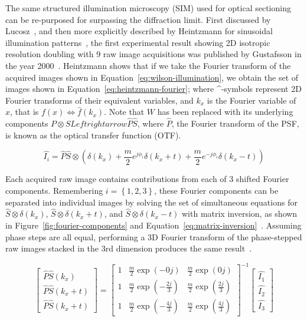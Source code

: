 The same structured illumination microscopy (SIM) used for optical sectioning can be re-purposed for surpassing the diffraction limit. 
First discussed by Lucosz~\cite{lukosz1966optical}, and then more explicitly described by Heintzmann for sinusoidal illumination patterns~\cite{heintzmann1999laterally}, the first experimental result showing 2D isotropic resolution doubling with 9 raw image acquisitions was published by Gustafsson in the year \num{2000}~\cite{gustafsson2000surpassing}. 
Heintzmann shows that if we take the Fourier transform of the acquired images shown in Equation~\ref{eq:wilson-illumination}, we obtain the set of images shown in Equation~\ref{eq:heintzmann-fourier}; where \^{}-symbols represent 2D Fourier transforms of their equivalent variables, and $k_x$ is the Fourier variable of $x$, that is $f(x) \Leftrightarrow \hat{f}(k_x)$. 
Note that $W$ has been replaced with its underlying components $P\otimes S Leftrightarrow \hat{P}\hat{S}$, where $\hat{P}$, the Fourier transform of the PSF, is known as the optical transfer function (OTF). 

\begin{equation} \label{eq:heintzmann-fourier}
\hat{I_i} = \hat{P} \hat{S} \otimes \left( \delta \left( k_x \right) + \frac{m}{2} e^{j\phi_i} \delta \left( k_x + t \right) + \frac{m}{2} e^{-j\phi_i} \delta \left( k_x - t \right) \right) 
\end{equation}

Each acquired raw image contains contributions from each of 3 shifted Fourier components. 
Remembering $i=\left\lbrace1,2,3\right\rbrace$, these Fourier components can be separated into individual images by solving the set of simultaneous equations for $\hat{S}\otimes\delta \left( k_x \right)$, $\hat{S}\otimes\delta \left( k_x + t \right)$, and $\hat{S}\otimes\delta \left( k_x - t \right)$ with matrix inversion, as shown in Figure~\ref{fig:fourier-components} and Equation~\ref{eq:matrix-inversion}~\cite{wicker2013phase}. 
Assuming phase steps are all equal, performing a 3D Fourier transform of the phase-stepped raw images stacked in the 3rd dimension produces the same result~\cite{gustafsson2005nonlinear}. 

\begin{equation} \label{eq:matrix-inversion}
\begin{bmatrix} \hat{P}\hat{S}\left(k_x\right) \\ \hat{P}\hat{S}\left(k_x+t\right) \\ \hat{P}\hat{S}\left(k_x+t\right) \end{bmatrix} = 
\begin{bmatrix}
1 & \frac{m}{2}\exp\left(-0j\right) & \frac{m}{2}\exp\left(0j\right) \\ 
1 & \frac{m}{2}\exp\left(-\frac{2j}{3}\right) & \frac{m}{2}\exp\left(\frac{2j}{3}\right) \\ 
1 & \frac{m}{2}\exp\left(-\frac{4j}{3}\right) & \frac{m}{2}\exp\left(\frac{4j}{3}\right)
\end{bmatrix}^{-1}
\begin{bmatrix} \hat{I_1} \\ \hat{I_2} \\ \hat{I_3} \end{bmatrix}
\end{equation}

